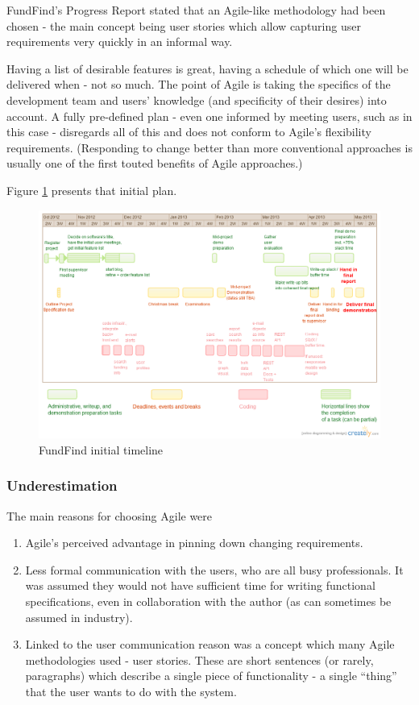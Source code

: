 FundFind's Progress Report \cite{progress-report} stated that an Agile-like methodology had been chosen - the main concept being user stories which allow capturing user requirements very quickly in an informal way.

Having a list of desirable features is great, having a schedule of which one will be delivered when - not so much. The point of Agile is taking the specifics of the development team and users' knowledge (and specificity of their desires) into account. A fully pre-defined plan - even one informed by meeting users, such as in this case - disregards all of this and does not conform to Agile's flexibility requirements. (Responding to change better than more conventional approaches is usually one of the first touted benefits of Agile approaches.) 

Figure \ref{fig:timeline} presents that initial plan.
\newpage
\begin{figure}[H]
\centering
\includegraphics[height=0.6\textheight,angle=90]{Images/timeline.png}
\caption{FundFind initial timeline}
\label{fig:timeline}
\end{figure}
\newpage

\subsubsection{Underestimation}

The main reasons for choosing Agile were
\label{agile-reasons}
\begin{enumerate}
 \item Agile's perceived advantage in pinning down changing requirements.
 \item Less formal communication with the users, who are all busy professionals. It was assumed they would not have sufficient time for writing functional specifications, even in collaboration with the author (as can sometimes be assumed in industry).
 \item Linked to the user communication reason was a concept which many Agile methodologies used - user stories. These are short sentences (or rarely, paragraphs) which describe a single piece of functionality - a single ``thing'' that the user wants to do with the system.
\end{enumerate}

